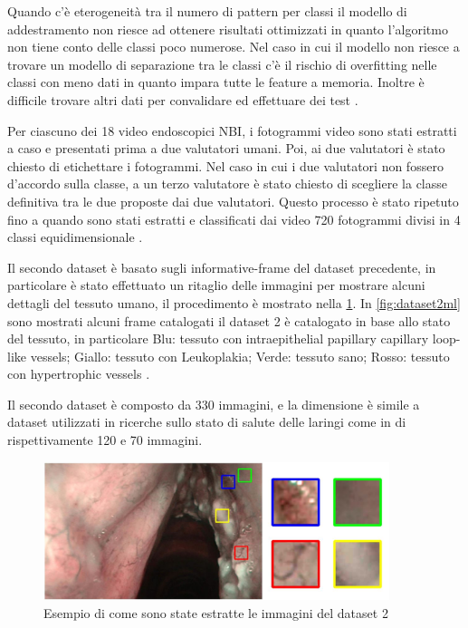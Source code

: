 Quando c'è eterogeneità tra il numero di pattern per classi il modello di addestramento non riesce ad ottenere risultati ottimizzati in quanto l'algoritmo non tiene conto delle classi poco numerose. Nel caso in cui il modello non riesce a trovare un modello di separazione tra le classi c'è il rischio di overfitting nelle classi con meno dati in quanto impara tutte le feature a memoria. Inoltre è difficile trovare altri dati per convalidare ed effettuare dei test \cite{chatterjee_deep_2018}.

Per ciascuno dei 18 video endoscopici NBI, i fotogrammi video sono stati estratti a caso e
presentati prima a due valutatori umani. Poi, ai due valutatori è stato chiesto di etichettare i fotogrammi. Nel caso in cui i due
valutatori non fossero d'accordo sulla classe, a un terzo valutatore è stato
chiesto di scegliere la classe definitiva tra le due proposte
dai due valutatori. Questo processo è stato ripetuto fino a quando sono stati estratti e classificati dai video 720 fotogrammi divisi in 4 classi equidimensionale \cite{moccia_larynge}.

Il secondo dataset è basato sugli informative-frame del dataset precedente, in particolare è stato effettuato un ritaglio delle immagini per mostrare   alcuni dettagli del tessuto umano, il procedimento è mostrato nella \cref{fig:dataset2}. In \cref{fig:dataset2ml} sono mostrati alcuni frame catalogati il dataset 2 è catalogato in base allo stato del tessuto, in particolare Blu: tessuto con intraepithelial papillary capillary loop-like vessels; Giallo: tessuto con Leukoplakia;
Verde: tessuto sano; Rosso: tessuto con hypertrophic vessels \cite{moccia_larynge}.

Il secondo dataset è composto da 330 immagini, e la dimensione è simile a dataset utilizzati in ricerche sullo stato di salute delle laringi come in \cite{narbalata_larynge} \cite{turkmen_larynge} di rispettivamente 120 e 70 immagini.

\begin{figure}[ht]
    \centering
    \includegraphics[width=0.9\textwidth]{introduzione/dataset-2.JPG}
    \caption{Esempio di come sono state estratte le immagini del dataset 2}
    \label{fig:dataset2}
\end{figure}

